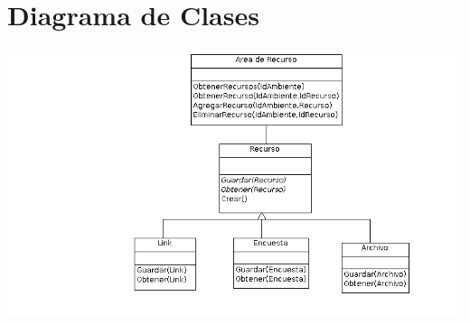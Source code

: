 \documentclass{article}
\begin{document}
\section{Diagrama de Clases}
	\includegraphics[scale=0.7]{Diagramadeclase2copia.png}
\pagebreak
	
\end{document}
